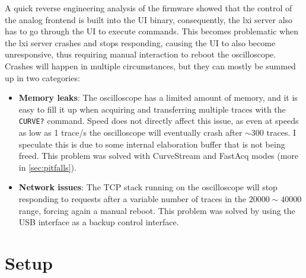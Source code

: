 \documentclass[a4paper,english,twoside,10pt]{article}
\begin{document}
A quick reverse engineering analysis of the firmware showed that the control of the analog frontend is built into the UI binary, consequently, the \gls{lxi} server also has to go through the UI to execute commands. This becomes problematic when the \gls{lxi} server crashes and stops responding, causing the UI to also become unresponsive, thus requiring manual interaction to reboot the oscilloscope. Crashes will happen in multiple circumstances, but they can mostly be summed up in two categories:
\begin{itemize}
	\item \textbf{Memory leaks}: The oscilloscope has a limited amount of memory, and it is easy to fill it up when acquiring and transferring multiple traces with the \texttt{CURVE?} command. Speed does not directly affect this issue, as even at speeds as low as 1 trace/s the oscilloscope will eventually crash after \(\sim 300\) traces. I speculate this is due to some internal elaboration buffer that is not being freed. This problem was solved with CurveStream and FastAcq modes (more in \ref{sec:pitfalls}).
	\item \textbf{Network issues}: The TCP stack running on the oscilloscope will stop responding to requests after a variable number of traces in the \(20000\sim 40000\) range, forcing again a manual reboot. This problem was solved by using the USB interface as a backup control interface.
\end{itemize}

\section{Setup}
\end{document}
